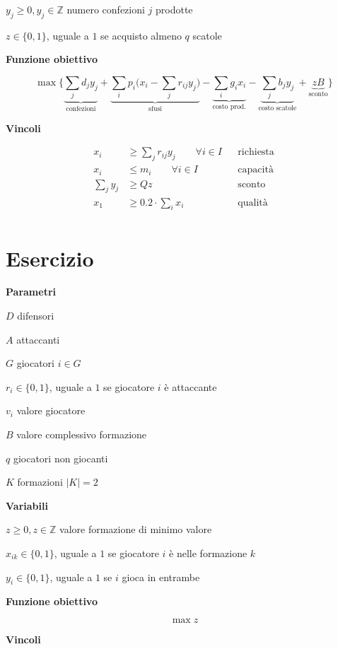 \documentclass[10pt,a4paper,twoside,openright]{book}
\newcounter{es}
\newcommand{\Es}{
	\stepcounter{es}
	\section{Esercizio \arabic{es}}
	}
\newcommand{\Par}{\textbf{Parametri}}
\newcommand{\Var}{\textbf{Variabili}}
\newcommand{\Fob}{\textbf{Funzione obiettivo}}
\newcommand{\Vin}{\textbf{Vincoli}}
\begin{document}
$y_{j} \geq 0,y_{j} \in \mathbb{Z}$ numero confezioni $j$ prodotte

$z\in \{0,1\}$, uguale a $1$ se acquisto almeno $q$ scatole

\Fob

\begin{equation*}
	\max\bigg\{\underbrace{\sum _{j} d_{j} y_{j}}_{\text{confezioni}} +\underbrace{\sum _{i} p_{i}\bigg( x_{i} -\sum _{j} r_{ij} y_{j}\bigg)}_{\text{sfusi}} -\underbrace{\sum _{i} g_{i} x_{i}}_{\text{costo prod.}} -\underbrace{\sum _{j} b_{j} y_{j}}_{\text{costo scatole}} +\underbrace{zB}_{\text{sconto}}\bigg\}
\end{equation*}

\Vin

\begin{align*}
	x_{i} & \geq \sum _{j} r_{ij} y_{j} \qquad\forall i\in I && \text{richiesta} \\
	x_{i} & \leq m_{i} \qquad\forall i\in I && \text{capacità} \\
	\sum _{j} y_{j} & \geq Qz && \text{sconto} \\
	x_{1} & \geq 0.2\cdot \sum _{i} x_{i} && \text{qualità} \\
\end{align*}

\Es

\Par

$D$ difensori

$A$ attaccanti

$G$ giocatori $i\in G$

$r_{i} \in \{0,1\}$, uguale a $1$ se giocatore $i$ è attaccante

$v_{i}$ valore giocatore

$B$ valore complessivo formazione

$q$ giocatori non giocanti

$K$ formazioni $|K|=2$

\Var

$z\geq 0,z\in \mathbb{Z}$ valore formazione di minimo valore

$x_{ik} \in \{0,1\}$, uguale a $1$ se giocatore $i$ è nelle formazione $k$

$y_{i} \in \{0,1\}$, uguale a $1$ se $i$ gioca in entrambe

\Fob

\begin{equation*}
	\max z
\end{equation*}

\Vin
\end{document}
